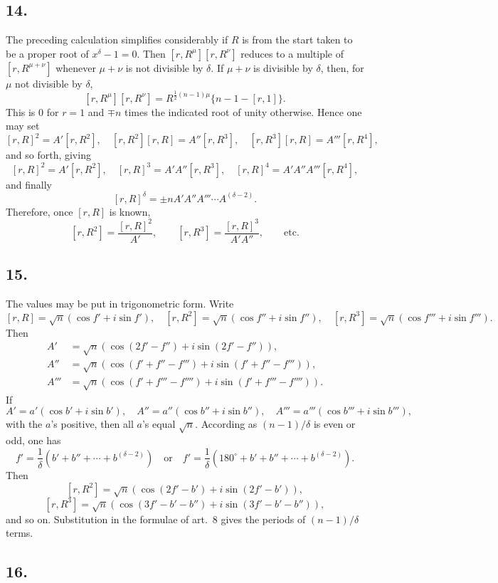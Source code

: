 \documentclass[12pt]{article}
\begin{document}
\subsection*{14.}

The preceding calculation simplifies considerably if $R$ is from the start taken to be a proper root of $x^\delta-1=0$. Then $[r,R^\mu][r,R^\nu]$ reduces to a multiple of $[r,R^{\mu+\nu}]$ whenever $\mu+\nu$ is not divisible by $\delta$. If $\mu+\nu$ is divisible by $\delta$, then, for $\mu$ not divisible by $\delta$,
\[
[r,R^\mu][r,R^\nu]=R^{\frac12(n-1)\mu}\{n-1-[r,1]\}.
\]
This is $0$ for $r=1$ and $\mp n$ times the indicated root of unity otherwise. Hence one may set
\[
[r,R]^2=A'[r,R^2],\quad
[r,R^2][r,R]=A''[r,R^3],\quad
[r,R^3][r,R]=A'''[r,R^4],
\]
and so forth, giving
\[
[r,R]^2=A'[r,R^2],\quad
[r,R]^3=A'A''[r,R^3],\quad
[r,R]^4=A'A''A'''[r,R^4],
\]
and finally
\[
[r,R]^\delta=\pm nA'A''A'''\cdots A^{(\delta-2)}.
\]
Therefore, once $[r,R]$ is known,
\[
[r,R^2]=\frac{[r,R]^2}{A'},\qquad
[r,R^3]=\frac{[r,R]^3}{A'A''},\qquad\text{etc.}
\]

\subsection*{15.}

The values may be put in trigonometric form. Write
\[
[r,R]=\sqrt n(\cos f'+i\sin f'),\quad
[r,R^2]=\sqrt n(\cos f''+i\sin f''),\quad
[r,R^3]=\sqrt n(\cos f'''+i\sin f''').
\]
Then
\[
\begin{aligned}
A'&=\sqrt n(\cos(2f'-f'')+i\sin(2f'-f'')),\\
A''&=\sqrt n(\cos(f'+f''-f''')+i\sin(f'+f''-f''')),\\
A'''&=\sqrt n(\cos(f'+f'''-f'''')+i\sin(f'+f'''-f'''')).
\end{aligned}
\]
If
\[
A'=a'(\cos b'+i\sin b'),\quad
A''=a''(\cos b''+i\sin b''),\quad
A'''=a'''(\cos b'''+i\sin b'''),
\]
with the $a$'s positive, then all $a$'s equal $\sqrt n$. According as $(n-1)/\delta$ is even or odd, one has
\[
f'=\frac1\delta(b'+b''+\cdots+b^{(\delta-2)})
\quad\text{or}\quad
f'=\frac1\delta(180^\circ+b'+b''+\cdots+b^{(\delta-2)}).
\]
Then
\[
[r,R^2]=\sqrt n(\cos(2f'-b')+i\sin(2f'-b')),
\]
\[
[r,R^3]=\sqrt n(\cos(3f'-b'-b'')+i\sin(3f'-b'-b'')),
\]
and so on. Substitution in the formulae of art.~8 gives the periods of $(n-1)/\delta$ terms.

\subsection*{16.}
\end{document}
